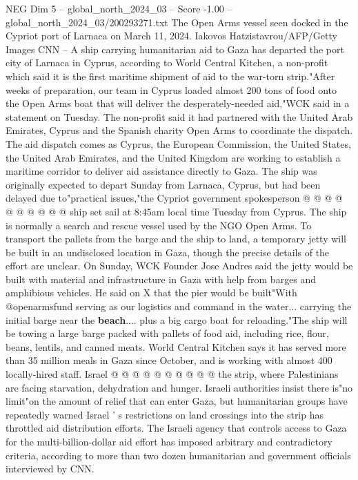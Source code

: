 \begin{textsample}{NEG Dim 5 – global\_north\_2024\_03 – Score -1.00 – global\_north\_2024\_03/200293271.txt}  \label{ex:f5_neg_163}
The Open Arms vessel seen docked in the Cypriot port of Larnaca on March 11, 2024.
Iakovos Hatzistavrou/AFP/Getty Images CNN -- A ship carrying humanitarian aid to Gaza has departed the port city of Larnaca in Cyprus, according to World Central Kitchen, a non-profit which said it is the first maritime shipment of aid to the war-torn strip."After weeks of preparation, our team in Cyprus loaded almost 200 tons of food onto the Open Arms boat that will deliver the desperately-needed aid,"WCK said in a statement on Tuesday.
The non-profit said it had partnered with the United Arab Emirates, Cyprus and the Spanish charity Open Arms to coordinate the dispatch.
The aid dispatch comes as Cyprus, the European Commission, the United States, the United Arab Emirates, and the United Kingdom are working to establish a maritime corridor to deliver aid assistance directly to Gaza.
The ship was originally expected to depart Sunday from Larnaca, Cyprus, but had been delayed due to"practical issues,"the Cypriot government spokesperson @ @ @ @ @ @ @ @ @ @ ship set sail at 8:45am local time Tuesday from Cyprus.
The ship is normally a search and rescue vessel used by the NGO Open Arms.
To transport the pallets from the barge and the ship to land, a temporary jetty will be built in an undisclosed location in Gaza, though the precise details of the effort are unclear.
On Sunday, WCK Founder Jose Andres said the jetty would be built with material and infrastructure in Gaza with help from barges and amphibious vehicles.
He said on X that the pier would be built"With @openarmsfund serving as our logistics and command in the water... carrying the initial barge near the \textbf{beach}.... plus a big cargo boat for reloading."The ship will be towing a large barge packed with pallets of food aid, including rice, flour, beans, lentils, and canned meats.
World Central Kitchen says it has served more than 35 million meals in Gaza since October, and is working with almost 400 locally-hired staff.
Israel @ @ @ @ @ @ @ @ @ @ the strip, where Palestinians are facing starvation, dehydration and hunger.
Israeli authorities insist there is"no limit"on the amount of relief that can enter Gaza, but humanitarian groups have repeatedly warned Israel ' s restrictions on land crossings into the strip has throttled aid distribution efforts.
The Israeli agency that controls access to Gaza for the multi-billion-dollar aid effort has imposed arbitrary and contradictory criteria, according to more than two dozen humanitarian and government officials interviewed by CNN.

\end{textsample}
